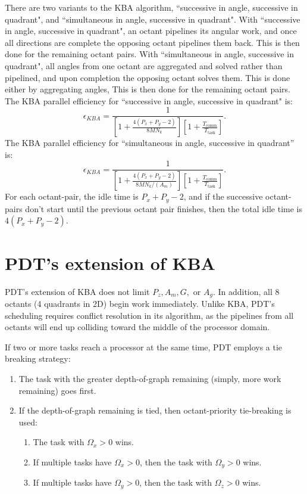 There are two variants to the KBA algorithm, ``successive in angle, successive in quadrant", and ``simultaneous in angle, successive in quadrant".  With ``successive in angle, successive in quadrant", an octant pipelines its angular work, and once all directions are complete the opposing octant pipelines them back. This is then done for the remaining octant pairs. With ``simultaneous in angle, successive in quadrant", all angles from one octant are aggregated and solved rather than pipelined, and upon completion the opposing octant solves them. This is done either by aggregating angles, This is then done for the remaining octant pairs. The KBA parallel efficiency \cite{mpadams2013} for ``successive in angle, successive in quadrant" is:
\begin{equation}
  \epsilon_{KBA} = \frac{1}{[1 + \frac{4(P_x+P_y-2)}{8MN_k}][1 + \frac{T_{\text{comm}}}{T_{\text{{task}}}}]}.
  \label{eps_kba}
\end{equation}
The KBA parallel efficiency for ``simultaneous in angle, successive in quadrant'' is:
\begin{equation}
   \epsilon_{KBA} = \frac{1}{[1 + \frac{4(P_x+P_y-2)}{8MN_k/(A_m)}][1 + \frac{T_{\text{comm}}}{T_{\text{{task}}}}]}.
   \label{eps_kba_simul}
\end{equation}
For each octant-pair, the idle time is $P_x + P_y - 2$, and if the successive octant-pairs don't start until the previous octant pair finishes, then the total idle time is $4(P_x + P_y - 2)$. 

\section{PDT's extension of KBA}\label {pdt_extension}

PDT's extension of KBA does not limit $P_z, A_m, G,$ or $A_g$. In addition, all 8 octants (4 quadrants in 2D) begin work immediately. Unlike KBA, PDT's scheduling requires conflict resolution in its algorithm, as the pipelines from all octants will end up colliding toward the middle of the processor domain.

If two or more tasks reach a processor at the same time, PDT employs a tie breaking strategy:

\begin{enumerate}
	\item The task with the greater depth-of-graph remaining (simply, more work remaining) goes first.
	\item If the depth-of-graph remaining is tied, then octant-priority tie-breaking is used:
	\begin{enumerate}
	  \item The task with $\Omega_x > 0$ wins.
	  \item If multiple tasks have $\Omega_x > 0$, then the task with $\Omega_y > 0$ wins.
	  \item If multiple tasks have $\Omega_y > 0$, then the task with $\Omega_z > 0$ wins.
	\end{enumerate}
\end{enumerate}

